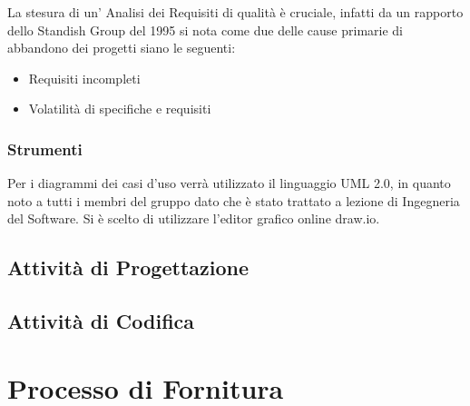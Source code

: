 			
			
			
			
			
			
			
			La stesura di un' Analisi dei Requisiti di qualità è cruciale, infatti
			da un rapporto dello Standish Group del 1995 si nota come due delle cause primarie
			di abbandono dei progetti siano le seguenti:
				\begin{itemize}
				\item Requisiti incompleti
				\item Volatilità di specifiche e requisiti
				\end{itemize}
			
			
			\subsubsection{Strumenti}
				Per i diagrammi dei casi d'uso verrà utilizzato il linguaggio UML 2.0,
				in quanto noto a tutti i membri del gruppo dato che è stato trattato a lezione
				di Ingegneria del Software.
				Si è scelto di utilizzare l'editor grafico online draw.io.
			
			
		\subsection{Attività di Progettazione}
		
		 
		
		 
		
		\subsection{Attività di Codifica}
		
	\section{Processo di Fornitura}
